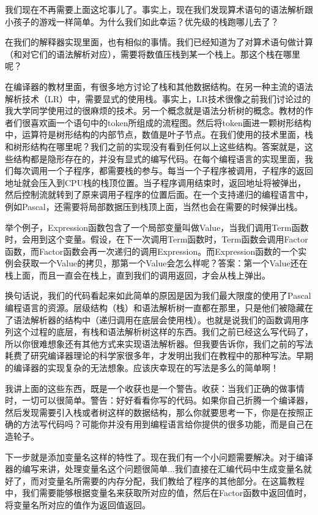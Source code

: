 我们现在不再需要上面这坨事儿了。事实上，现在我们发现算术语句的语法解析跟小孩子的游戏一样简单。为什么我们如此幸运？优先级的栈跑哪儿去了？

在我们的解释器实现里面，也有相似的事情。我们已经知道为了对算术语句做计算（和对它们的语法解析对应），需要将数值压栈到某一个栈上。那这个栈在哪里呢？

在编译器的教材里面，有很多地方讨论了栈和其他数据结构。在另一种主流的语法解析技术（LR）中，需要显式的使用栈。事实上，LR技术很像之前我们讨论过的我大学同学使用过的很麻烦的技术。另一个概念就是语法分析树的概念。教材的作者们很喜欢画一个语句中的token所组成的流程图。然后将token画进一颗树形结构中，运算符是树形结构的内部节点，数值是叶子节点。在我们使用的技术里面，栈和树形结构在哪里呢？我们之前的实现没有看到任何以上这些结构。答案就是，这些结构都是隐形存在的，并没有显式的编写代码。在每个编程语言的实现里面，我们每次调用一个子程序，都需要栈的参与。每当一个子程序被调用，子程序的返回地址就会压入到CPU栈的栈顶位置。当子程序调用结束时，返回地址将被弹出，然后控制流就转到了原来调用子程序的位置后面。在一个支持递归的编程语言中，例如Pascal，还需要将局部数据压到栈顶上面，当然也会在需要的时候弹出栈。

举个例子，Expression函数包含了一个局部变量叫做Value，当我们调用Term函数时，会用到这个变量。假设，在下一次调用Term函数时，Term函数会调用Factor函数，而Factor函数会再一次递归的调用Expression。而Expression函数的一个实例会获取一个Value的拷贝，那第一个Value会怎么样呢？答案：第一个Value还在栈上面，而且一直会在栈上，直到我们的调用返回，才会从栈上弹出。

换句话说，我们的代码看起来如此简单的原因是因为我们最大限度的使用了Pascal编程语言的资源。层级结构（栈）和语法解析树一直都在那里，只是他们被隐藏在了语法解析器的结构中（递归调用在底层会使用栈）。也就是说我们的函数调用序列这个过程的底层，有栈和语法解析树这样的东西。我们之前已经这么写代码了，所以你很难想象还有其他方式来实现语法解析器。但我要告诉你，我们之前的写法耗费了研究编译器理论的科学家很多年，才发明出我们在教程中的那种写法。早期的编译器的实现复杂的无法想象。应该庆幸现在的写法是多么的简单啊！

我讲上面的这些东西，既是一个收获也是一个警告。收获：当我们正确的做事情时，一切可以很简单。警告：好好看看你写的代码。如果你自己折腾一个编译器，然后发现需要引入栈或者树这样的数据结构，那么你就要思考一下，你是在按照正确的方法写代码吗？可能你并没有用到编程语言给你提供的很多功能，而是自己在造轮子。

下一步就是添加变量名这样的特性了。现在我们有一个小问题需要解决。对于编译器的编写来讲，处理变量名这个问题很简单...我们直接在汇编代码中生成变量名就好了，而对变量名所需要的内存分配，我们教给了程序的其他部分。在这篇教程中，我们需要能够根据变量名来获取所对应的值，然后在Factor函数中返回值时，将变量名所对应的值作为返回值返回。

